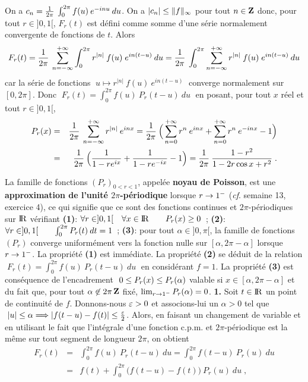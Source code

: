 \documentclass{article}
\begin{document}
On a $c_n={1\over2\pi}\>\int_0^{2\pi}f(u)\>e^{-inu}\>du$. On a $|c_n|\leq\|f\|_{\infty}$ pour tout $n\in\zmat$ donc, pour tout $r\in]0,1[$, $F_r(t)$ est d\'efini comme somme d'une s\'erie normalement convergente de fonctions de $t$. Alors\vv
$$F_r(t)={1\over2\pi}\>\sum_{n=-\infty}^{+\infty}\int_0^{2\pi}r^{|n|}\>f(u)\;e^{in(t-u)}\>du={1\over2\pi}\>\int_0^{2\pi}\sum_{n=-\infty}^{+\infty}r^{|n|}\>f(u)\;e^{in(t-u)}\>du$$
car la s\'erie de fonctions $\;u\mapsto r^{|n|}\>f(u)\>e^{in(t-u)}\;$ converge normalement sur $[0,2\pi]$.\msk
Donc $\;F_r(t)=\int_0^{2\pi}f(u)\>P_r(t-u)\>du\;$ en posant, pour tout $x$ r\'eel et tout $r\in]0,1[$,\vv
\begin{eqnarray*}
P_r(x) & = & {1\over 2\pi}\>\sum_{n=-\infty}^{+\infty}r^{|n|}\>e^{inx}
             =   {1\over 2\pi}\>\Big(\sum_{n=0}^{+\infty}r^n\>e^{inx}+\sum_{n=0}^{+\infty}r^n\>e^{-inx}-1\Big)\\
& = & {1\over2\pi}\>\Big({1\over1-re^{ix}}+{1\over1-re^{-ix}}-1\Big)={1\over2\pi}\>{1-r^2\over1-2r\cos x+r^2}\;.
\end{eqnarray*}
\par
La famille de fonctions $(P_r)_{0<r<1}$, appel\'ee {\bf noyau de Poisson}, est une {\bf approximation de l'unit\'e $2\pi$-p\'eriodique} lorsque $r\rightarrow 1^-$ ({\it cf}. semaine 13, exercice 4), ce qui signifie que ce sont des fonctions continues et $2\pi$-p\'eriodiques sur ${\rm I\kern-0.6mm R}$ v\'erifiant\ssk\sect
{\bf (1)}\quad : \quad $\forall r\in]0,1[\quad\forall x\in{\rm I\kern-0.6mm R}\qquad P_r(x)\geq0$~;\ssk\sect
{\bf (2)}\quad : \quad $\forall r\in]0,1[\qquad\int_0^{2\pi}P_r(t)\>dt=1$~;\ssk\sect
{\bf (3)}\quad : \quad pour tout $\alpha\in]0,\pi[$, la famille de fonctions $(P_r)$ converge uniform\'ement vers la fonction nulle sur $[\alpha,2\pi-\alpha]$ lorsque $r\rightarrow1^-$.
\ssk
La propri\'et\'e {\bf (1)} est imm\'ediate.\ssk
La propri\'et\'e {\bf (2)} se d\'eduit de la relation $\;F_r(t)=\int_0^{2\pi}f(u)\>P_r(t-u)\>du\;$ en consid\'erant $f=1$.\ssk
La propri\'et\'e {\bf (3)} est cons\'equence de l'encadrement $\;0\leq P_r(x)\leq P_r(\alpha)$ valable si $x\in[\alpha,2\pi-\alpha]$ et du fait que, pour tout $\alpha\not\in2\pi\zmat$ fix\'e, $\lim_{r\rightarrow1^-}P_r(\alpha)=0$.
\msk
{\bf 1.} Soit $t\in{\rm I\kern-0.6mm R}$ un point de continuit\'e de $f$. Donnons-nous $\varepsilon>0$ et associons-lui un $\alpha>0$ tel que $\;|u|\leq\alpha\Longrightarrow|f(t-u)-f(t)|\leq{\varepsilon\over2}$. Alors, en faisant un changement de variable et en utilisant le fait que l'int\'egrale d'une fonction c.p.m. et $2\pi$-p\'eriodique est la m\^eme sur tout segment de longueur $2\pi$, on obtient\vv
\begin{eqnarray*}
F_r(t) & = & \int_0^{2\pi}f(u)\>P_r(t-u)\>du = \int_0^{2\pi} f(t-u)\>P_r(u)\>du\\
         & = & f(t)+\int_0^{2\pi}\big(f(t-u)-f(t)\big)\>P_r(u)\>du\;,
\end{eqnarray*}
\end{document}
